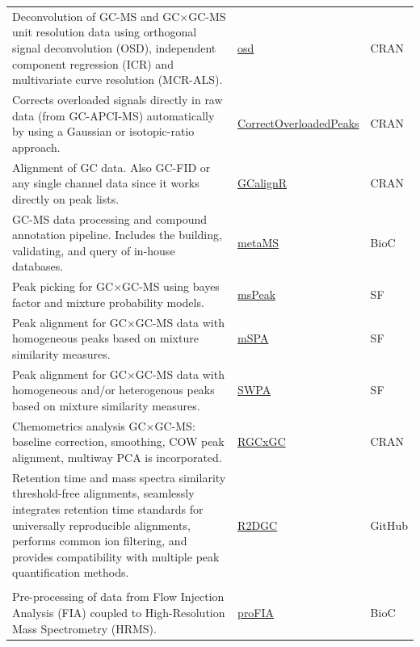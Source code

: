\documentclass[]{article}
\begin{document}
\begin{longtable}{>{\raggedright\arraybackslash}p{30em}>{\raggedright\arraybackslash}p{10em}>{\raggedright\arraybackslash}p{3em}}
Deconvolution of GC-MS and GC×GC-MS unit resolution data using orthogonal signal deconvolution (OSD), independent component regression (ICR) and multivariate curve resolution (MCR-ALS). & \href{http://cran.r-project.org/package=osd}{osd} & CRAN\\
\rowcolor{gray!6}  Corrects overloaded signals directly in raw data (from GC-APCI-MS) automatically by using a Gaussian or isotopic-ratio approach. & \href{https://cran.r-project.org/package=CorrectOverloadedPeaks}{CorrectOverloadedPeaks} & CRAN\\
Alignment of GC data. Also GC-FID or any single channel data since it works directly on peak lists. & \href{https://cran.r-project.org/package=GCalignR}{GCalignR} & CRAN\\
\rowcolor{gray!6}  GC-MS data processing and compound annotation pipeline. Includes the building, validating, and query of in-house databases. & \href{https://www.bioconductor.org/packages/release/bioc/html/metaMS.html}{metaMS} & BioC\\
Peak picking for GC×GC-MS using bayes factor and mixture probability models. & \href{http://mrr.sourceforge.net/download.html}{msPeak} & SF\\
\rowcolor{gray!6}  Peak alignment for GC×GC-MS data with homogeneous peaks based on mixture similarity measures. & \href{http://mrr.sourceforge.net/download.html}{mSPA} & SF\\
Peak alignment for GC×GC-MS data with homogeneous and/or heterogenous peaks based on mixture similarity measures. & \href{http://mrr.sourceforge.net/download.html}{SWPA} & SF\\
\rowcolor{gray!6}  Chemometrics analysis GC×GC-MS: baseline correction, smoothing, COW peak alignment, multiway PCA is incorporated. & \href{https://cran.r-project.org/package=RGCxGC}{RGCxGC} & CRAN\\
Retention time and mass spectra similarity threshold-free alignments, seamlessly integrates retention time standards for universally reproducible alignments, performs common ion filtering, and provides compatibility with multiple peak quantification methods. & \href{https://github.com/rramaker/R2DGC}{R2DGC} & GitHub\\
\rowcolor{gray!6}  \addlinespace[0.3em]
\multicolumn{3}{l}{\textbf{Flow injection / direct infusion analysis}}\\
Pre-processing of data from Flow Injection Analysis (FIA) coupled to High-Resolution Mass Spectrometry (HRMS). & \href{https://doi.org/doi:10.18129/B9.bioc.proFIA}{proFIA} & BioC\\

\end{longtable}
\end{document}

